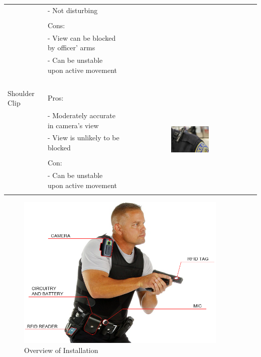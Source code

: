 \documentclass[12pt]{article}
\begin{document}
\begin{table}[h!]
\begin{tabular}{|l|l|c|}
                   & - Not disturbing & \\
                   & & \\
                   & Cons:  & \\
                   & - View can be blocked by officer' arms & \\
                   & - Can be unstable upon active movement  & \\
                   & & \\
                   & & \\
                   & & \\
        \hline
        & & \\
        Shoulder Clip & Pros: & \multirow{7}{*}{\includegraphics[width=0.3\textwidth]{shoulder_mount}}\\
                      & - Moderately accurate in camera's view & \\
                      & - View is unlikely to be blocked & \\
                      & & \\
                      & Con: & \\
                      & - Can be unstable upon active movement  & \\
                      & & \\
        \hline
    \end{tabular}
\end{table}

\begin{figure}[h!]
    \centering
    \includegraphics[width=0.9\textwidth]{installation}
    \caption{Overview of Installation}
\end{figure}
\end{document}

